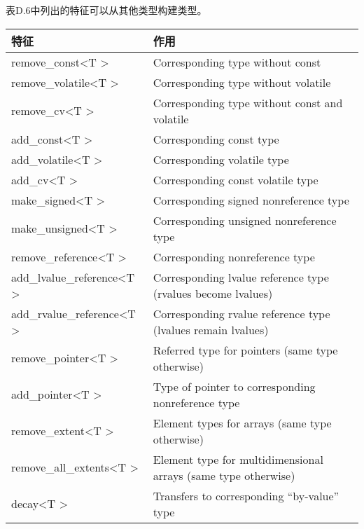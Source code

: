 
表D.6中列出的特征可以从其他类型构建类型。

\begin{table}[H]
	\begin{center}
	\begin{tabular}{l|l}
		\hline
		\textbf{特征}                                    & \textbf{作用}                                                \\ \hline
		remove\_const\textless{}T \textgreater{}          & Corresponding type without const                               \\ \hline
		remove\_volatile\textless{}T \textgreater{}       & Corresponding type without volatile                            \\ \hline
		remove\_cv\textless{}T \textgreater{}             & Corresponding type without const and volatile                  \\ \hline
		add\_const\textless{}T \textgreater{}             & Corresponding const type                                       \\ \hline
		add\_volatile\textless{}T \textgreater{}          & Corresponding volatile type                                    \\ \hline
		add\_cv\textless{}T \textgreater{}                & Corresponding const volatile type                              \\ \hline
		make\_signed\textless{}T \textgreater{}           & Corresponding signed nonreference type                         \\ \hline
		make\_unsigned\textless{}T \textgreater{}         & Corresponding unsigned nonreference type                       \\ \hline
		remove\_reference\textless{}T \textgreater{}      & Corresponding nonreference type                                \\ \hline
		add\_lvalue\_reference\textless{}T \textgreater{} & Corresponding lvalue reference type (rvalues become lvalues)   \\ \hline
		add\_rvalue\_reference\textless{}T \textgreater{} & Corresponding rvalue reference type (lvalues remain lvalues)   \\ \hline
		remove\_pointer\textless{}T \textgreater{}        & Referred type for pointers (same type otherwise)               \\ \hline
		add\_pointer\textless{}T \textgreater{}           & Type of pointer to corresponding nonreference type             \\ \hline
		remove\_extent\textless{}T \textgreater{}         & Element types for arrays (same type otherwise)                 \\ \hline
		remove\_all\_extents\textless{}T \textgreater{}   & Element type for multidimensional arrays (same type otherwise) \\ \hline
		decay\textless{}T \textgreater{}                  & Transfers to corresponding “by-value” type                     \\ \hline
	\end{tabular}
	\end{center}
\end{table}

